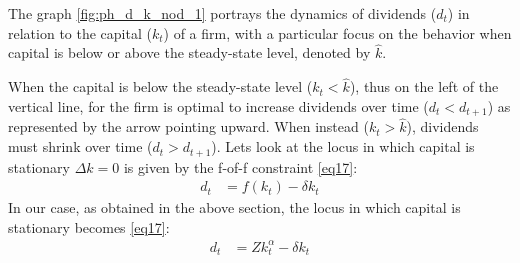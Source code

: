 \documentclass[12pt]{report}
\begin{document}
The graph \autoref{fig:ph_d_k_nod_1} portrays the dynamics of dividends (\(d_t\)) in relation to the capital (\(k_t\)) of a firm, with a
particular focus on the behavior when capital is below or above the steady-state level,  denoted by \(\hat{k}\).

When the capital is below the steady-state level (\(k_t < \hat{k}\)), thus on the left of the vertical line, for the
firm is optimal to increase dividends over time (\(d_t<d_{t+1}\)) as represented by the arrow pointing upward. When instead
(\(k_t > \hat{k}\)), dividends must shrink over time (\(d_t>d_{t+1}\)).
Lets look at the locus in which capital is stationary \(\Delta k = 0 \) is given by the f-of-f constraint \ref{eq17}:
\begin{align}
    d_t & = f(k_t) - \delta k_t
\end{align}
In our case, as obtained in the above section, the locus in which capital is stationary becomes \ref{eq17}:
\begin{align}
    d_t &=Z k^{\alpha}_t-\delta k_t
\end{align}
\end{document}

